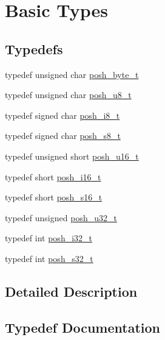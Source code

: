 \hypertarget{group__PoshTypes}{}\section{Basic Types}
\label{group__PoshTypes}
\subsection*{Typedefs}
\begin{DoxyCompactItemize}
\item 
typedef unsigned char \hyperlink{group__PoshTypes_ga3d52997a5402758b6d8cea03bb931f05}{posh\+\_\+byte\+\_\+t}
\item 
typedef unsigned char \hyperlink{group__PoshTypes_ga6c9edb76b9a22de1ce694739649d17ea}{posh\+\_\+u8\+\_\+t}
\item 
typedef signed char \hyperlink{group__PoshTypes_ga7bbad3ba2e3a2ed629142c297c31ec04}{posh\+\_\+i8\+\_\+t}
\item 
typedef signed char \hyperlink{group__PoshTypes_gaded1f017e9a4317ae12199921b77a39e}{posh\+\_\+s8\+\_\+t}
\item 
typedef unsigned short \hyperlink{group__PoshTypes_ga8ef2f2264276677d018795b0ff67d486}{posh\+\_\+u16\+\_\+t}
\item 
typedef short \hyperlink{group__PoshTypes_ga264eadd7cae2a9268478671773189b4a}{posh\+\_\+i16\+\_\+t}
\item 
typedef short \hyperlink{group__PoshTypes_gabb2c3e11f94548b8c3bc63fbbe7c2110}{posh\+\_\+s16\+\_\+t}
\item 
typedef unsigned \hyperlink{group__PoshTypes_ga020bf929bf912667f0fa4312d816c2e0}{posh\+\_\+u32\+\_\+t}
\item 
typedef int \hyperlink{group__PoshTypes_gad70940538f6f13aff31955da2ceaa48b}{posh\+\_\+i32\+\_\+t}
\item 
typedef int \hyperlink{group__PoshTypes_gaa13412fdeac2c495d0e0278bd28ac8cb}{posh\+\_\+s32\+\_\+t}
\end{DoxyCompactItemize}


\subsection{Detailed Description}


\subsection{Typedef Documentation}
